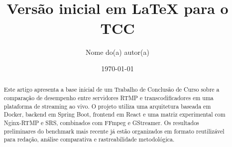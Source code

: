 \documentclass[12pt,a4paper]{article}
\title{\articletitle\\\large Versão inicial em LaTeX para o TCC}
\author{Nome do(a) autor(a)}
\date{\today}
\begin{document}
\maketitle

\begin{abstract}
Este artigo apresenta a base inicial de um Trabalho de Conclusão de Curso sobre a comparação de desempenho entre servidores RTMP e transcodificadores em uma plataforma de streaming ao vivo. O projeto utiliza uma arquitetura baseada em Docker, backend em Spring Boot, frontend em React e uma matriz experimental com Nginx-RTMP e SRS, combinados com FFmpeg e GStreamer. Os resultados preliminares do benchmark mais recente já estão organizados em formato reutilizável para redação, análise comparativa e rastreabilidade metodológica.
\end{abstract}

\tableofcontents
\clearpage









\clearpage

\end{document}
